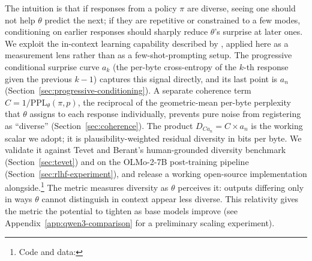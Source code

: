 The intuition is that if responses from a policy $\pi$ are diverse, seeing one should not help $\theta$ predict the next; if they are repetitive or constrained to a few modes, conditioning on earlier responses should sharply reduce $\theta$'s surprise at later ones.
We exploit the in-context learning capability described by \citet{brown2020language}, applied here as a measurement lens rather than as a few-shot-prompting setup.
The progressive conditional surprise curve $a_k$ (the per-byte cross-entropy of the $k$-th response given the previous $k{-}1$) captures this signal directly, and its last point is $a_n$ (Section~\ref{sec:progressive-conditioning}).
A separate coherence term $C = 1/\mathrm{PPL}_\theta(\pi, p)$, the reciprocal of the geometric-mean per-byte perplexity that $\theta$ assigns to each response individually, prevents pure noise from registering as ``diverse'' (Section~\ref{sec:coherence}).
The product $D_{Ca_n} = C \times a_n$ is the working scalar we adopt; it is plausibility-weighted residual diversity in bits per byte.
We validate it against Tevet and Berant's human-grounded diversity benchmark (Section~\ref{sec:tevet}) and on the OLMo-2-7B post-training pipeline (Section~\ref{sec:rlhf-experiment}), and release a working open-source implementation alongside.\footnote{Code and data: \projectGithubUrl}
The metric measures diversity as $\theta$ perceives it: outputs differing only in ways $\theta$ cannot distinguish in context appear less diverse.
This relativity gives the metric the potential to tighten as base models improve (see Appendix~\ref{app:qwen3-comparison} for a preliminary scaling experiment).

